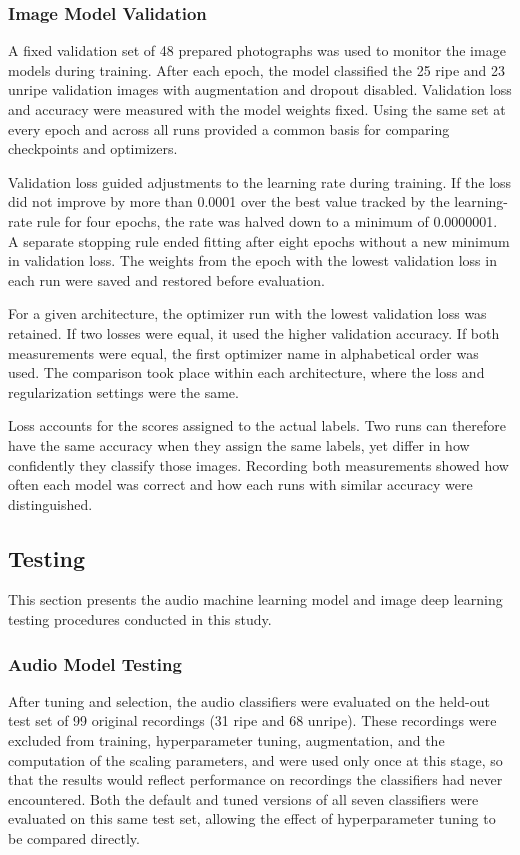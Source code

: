 \begin{thesisprose}
\subsubsection*{Image Model Validation}

A fixed validation set of 48 prepared photographs was used to monitor the image models during training. After each epoch, the model classified the 25 ripe and 23 unripe validation images with augmentation and dropout disabled. Validation loss and accuracy were measured with the model weights fixed. Using the same set at every epoch and across all runs provided a common basis for comparing checkpoints and optimizers.

Validation loss guided adjustments to the learning rate during training. If the loss did not improve by more than 0.0001 over the best value tracked by the learning-rate rule for four epochs, the rate was halved down to a minimum of 0.0000001. A separate stopping rule ended fitting after eight epochs without a new minimum in validation loss. The weights from the epoch with the lowest validation loss in each run were saved and restored before evaluation.

For a given architecture, the optimizer run with the lowest validation loss was retained. If two losses were equal, it used the higher validation accuracy. If both measurements were equal, the first optimizer name in alphabetical order was used. The comparison took place within each architecture, where the loss and regularization settings were the same.

Loss accounts for the scores assigned to the actual labels. Two runs can therefore have the same accuracy when they assign the same labels, yet differ in how confidently they classify those images. Recording both measurements showed how often each model was correct and how each runs with similar accuracy were distinguished.

\subsection{Testing}

This section presents the audio machine learning model and image deep learning testing procedures conducted in this study.

\subsubsection*{Audio Model Testing}

After tuning and selection, the audio classifiers were evaluated on the held-out test set of 99 original recordings (31 ripe and 68 unripe). These recordings were excluded from training, hyperparameter tuning, augmentation, and the computation of the scaling parameters, and were used only once at this stage, so that the results would reflect performance on recordings the classifiers had never encountered. Both the default and tuned versions of all seven classifiers were evaluated on this same test set, allowing the effect of hyperparameter tuning to be compared directly.


\end{thesisprose}
